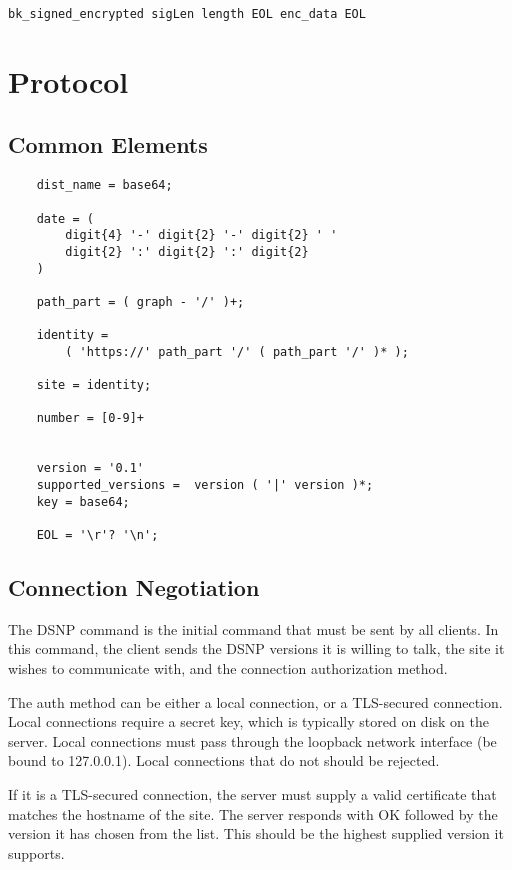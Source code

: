 \documentclass[letterpaper,11pt,oneside]{article}
\begin{document}
\vspace{10pt}
\begin{verbatim}
bk_signed_encrypted sigLen length EOL enc_data EOL
\end{verbatim}
\vspace{10pt}

\section{Protocol}

\subsection{Common Elements}

\vspace{10pt}
\begin{verbatim}
    dist_name = base64;

    date = (
        digit{4} '-' digit{2} '-' digit{2} ' ' 
        digit{2} ':' digit{2} ':' digit{2} 
    )

    path_part = ( graph - '/' )+;

    identity = 
        ( 'https://' path_part '/' ( path_part '/' )* );

    site = identity;

    number = [0-9]+           


    version = '0.1'
    supported_versions =  version ( '|' version )*;
    key = base64;

    EOL = '\r'? '\n';
\end{verbatim}

\subsection{Connection Negotiation}

The DSNP command is the initial command that must be sent by all clients. In
this command, the client sends the DSNP versions it is willing to talk, the
site it wishes to communicate with, and the connection authorization method.

The auth method can be either a local connection, or a TLS-secured connection.
Local connections require a secret key, which is typically stored on disk on
the server. Local connections must pass through the loopback network interface
(be bound to 127.0.0.1). Local connections that do not should be rejected.

If it is a TLS-secured connection, the server must supply a valid certificate
that matches the hostname of the site. The server responds with OK followed by
the version it has chosen from the list. This should be the highest supplied
version it supports.
\end{document}
